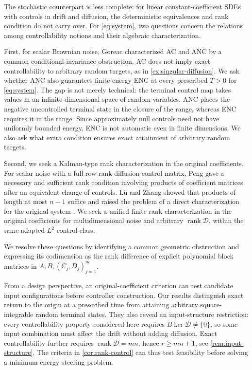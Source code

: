 \documentclass[twocolumn]{autart}
\newcounter{part}
\begin{document}
The stochastic counterpart is less complete: for linear constant-coefficient SDEs with controls in drift and diffusion, the deterministic equivalences and rank condition do not carry over. For \cref{eq:system}, two questions concern the relations among controllability notions and their algebraic characterization.

First, for scalar Brownian noise, Goreac \cite{Goreac} characterized AC and ANC by a common conditional-invariance obstruction. AC does not imply exact controllability to arbitrary random targets, as in \cref{ex:singular-diffusion}. We ask whether ANC also guarantees finite-energy ENC at every prescribed \(T>0\) for \cref{eq:system}. The gap is not merely technical: the terminal control map takes values in an infinite-dimensional space of random variables. ANC places the negative uncontrolled terminal state in the closure of the range, whereas ENC requires it in the range. Since approximately null controls need not have uniformly bounded energy, ENC is not automatic even in finite dimensions. We also ask what extra condition ensures exact attainment of arbitrary random targets.

Second, we seek a Kalman-type rank characterization in the original coefficients. For scalar noise with a full-row-rank diffusion-control matrix, Peng \cite[pp.~281--282 and Theorem~3.2]{Peng1994} gave a necessary and sufficient rank condition involving products of coefficient matrices after an equivalent change of controls. L\"u and Zhang \cite[Theorem~6.10]{Lue2021a} showed that products of length at most \(n-1\) suffice and raised the problem of a direct characterization for the original system \cite[Remark~6.11]{Lue2021a}. We seek a unified finite-rank characterization in the original coefficients for multidimensional noise and arbitrary \(\operatorname{rank}\mathcal D\), within the same adapted \(L^2\) control class.

We resolve these questions by identifying a common geometric obstruction and expressing its codimension as the rank difference of explicit polynomial block matrices in \(A,B,(C_j,D_j)_{j=1}^m\).

From a design perspective, an original-coefficient criterion can test candidate input configurations before controller construction. Our results distinguish exact return to the origin at a prescribed time from attaining arbitrary square-integrable random terminal states. They also reveal an input-structure restriction: every controllability property considered here requires \(B\ker\mathcal D\neq\{0\}\), so some input combination must affect the drift without adding diffusion. Exact controllability further requires \(\operatorname{rank}\mathcal D=mn\), hence \(r\geq mn+1\); see \cref{rem:input-structure}. The criteria in \cref{cor:rank-control} can thus test feasibility before solving a minimum-energy steering problem.
\end{document}

